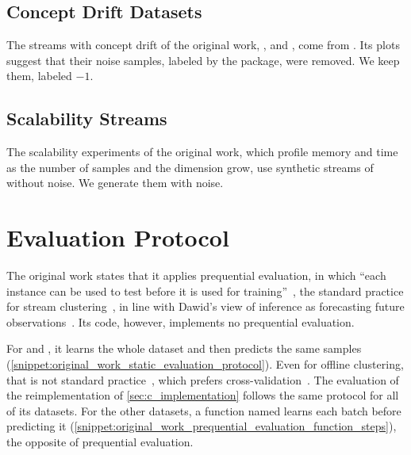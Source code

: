 \subsection{Concept Drift Datasets}

The streams with concept drift of the original work, \BenchmarkOne, \BenchmarkTwo and \RandomRBFGeneratorEvents, come from . Its plots suggest that their noise samples, labeled  by the package, were removed. We keep them, labeled $-1$.

\subsection{Scalability Streams}

The scalability experiments of the original work, which profile memory and time as the number of samples and the dimension grow, use synthetic streams of  without noise. We generate them with noise.

\section{Evaluation Protocol}
\label{sec:prequential_sequential_offline_evaluation}

The original work states that it applies prequential evaluation, in which ``each instance can be used to test before it is used for training''~\cite[Section 5.2.1]{maia2020evolvclus}, the standard practice for stream clustering~\cite{akinosho2023comparative,wang2023data,rezaei2025,mutambik2024,jahn2026goingoffline}, in line with Dawid's view of inference as forecasting future observations~\cite{dawid1984prequential}. Its code, however, implements no prequential evaluation.

For  and , it learns the whole dataset and then predicts the same samples (\cref{snippet:original_work_static_evaluation_protocol}). Even for offline clustering, that is not standard practice~\cite{kaufman2012leakage,kapoor2023leakage,arias2024improved,halkidi2001validation}, which prefers cross-validation~\cite{stone1974cross,kohavi1995study}. The evaluation of the  reimplementation of \cref{sec:c_implementation} follows the same protocol for all of its datasets. For the other datasets, a function named  learns each batch before predicting it (\cref{snippet:original_work_prequential_evaluation_function_steps}), the opposite of prequential evaluation.

